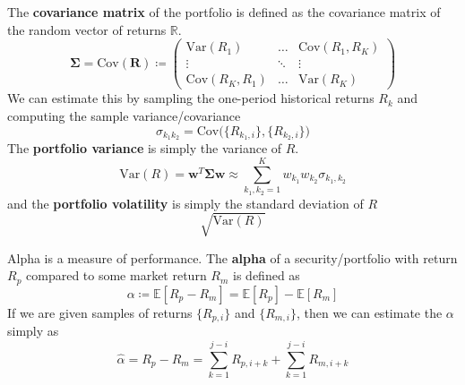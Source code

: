 \documentclass{article}
\begin{document}
  \begin{definition}
    The \textbf{covariance matrix} of the portfolio is defined as the covariance matrix of the random vector of returns $\mathbb{R}$. 
    \begin{equation}
      \boldsymbol{\Sigma} = \mathrm{Cov}(\mathbf{R}) \coloneqq \begin{pmatrix} \mathrm{Var}(R_1) & \ldots & \mathrm{Cov}(R_1, R_K) \\ \vdots & \ddots & \vdots \\ \mathrm{Cov}(R_K, R_1) & \ldots & \mathrm{Var}(R_K) \end{pmatrix} 
    \end{equation}
    We can estimate this by sampling the one-period historical returns $R_k$ and computing the sample variance/covariance 
    \begin{equation}
      \sigma_{k_1 k_2} = \mathrm{Cov} \big( \{R_{k_1, i}\}, \{R_{k_2, i}\} \big)
    \end{equation}
    The \textbf{portfolio variance} is simply the variance of $R$. 
    \begin{equation}
      \mathrm{Var}(R) = \mathbf{w}^T \boldsymbol{\Sigma} \mathbf{w} \approx \sum_{k_1, k_2 = 1}^K w_{k_1} w_{k_2} \sigma_{k_1, k_2}
    \end{equation}
    and the \textbf{portfolio volatility} is simply the standard deviation of $R$ 
    \begin{equation}
      \sqrt{\mathrm{Var}(R)}
    \end{equation}
  \end{definition}

  \begin{definition}[Alpha]
    Alpha is a measure of performance. The \textbf{alpha} of a security/portfolio with return $R_p$ compared to some market return $R_m$ is defined as 
    \begin{equation}
      \alpha \coloneqq \mathbb{E}[R_p - R_m] = \mathbb{E}[R_p] - \mathbb{E}[R_m]
    \end{equation}
    If we are given samples of returns $\{R_{p, i}\}$ and $\{R_{m, i}\}$, then we can estimate the $\alpha$ simply as 
    \begin{equation}
      \hat{\alpha} = R_p - R_m = \sum_{k = 1}^{j-i} R_{p, i + k} + \sum_{k=1}^{j-i} R_{m, i + k}
    \end{equation}
  \end{definition}
\end{document}
